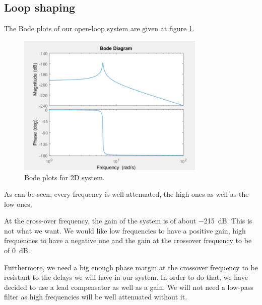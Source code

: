 \subsection{Loop shaping}
The Bode plots of our open-loop system are given at figure \ref{fig:bode-ol}.
\begin{figure}[H]
    \centering
    \includegraphics[width=0.8\textwidth]{resources/png/bode-ol.png}
    \caption{Bode plots for 2D system.}
    \label{fig:bode-ol}
\end{figure}
As can be seen, every frequency is well attenuated, the high ones as well as the low ones.\par
At the cross-over frequency, the gain of the system is of about \SI{-215}{\deci\bel}. This is not what we want. We would like low frequencies to have a positive gain, high frequencies to have a negative one and the gain at the crossover frequency to be of \SI{0}{\deci\bel}.\par
Furthermore, we need a big enough phase margin at the crossover frequency to be resistant to the delays we will have in our system. In order to do that, we have decided to use a lead compensator as well as a gain. We will not need a low-pass filter as high frequencies will be well attenuated without it.

